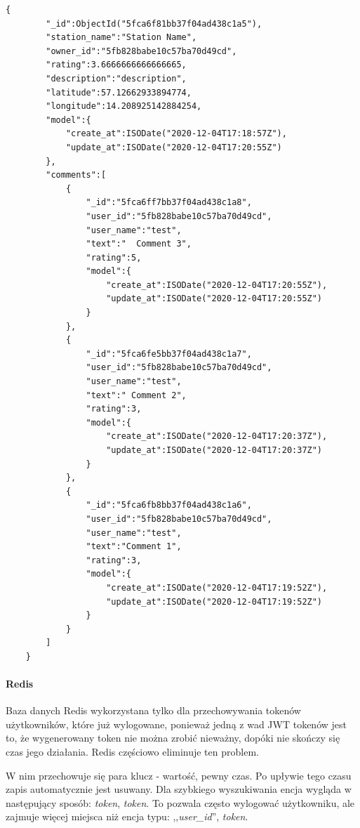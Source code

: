 \begin{lstlisting}[basicstyle=\tiny\ttfamily]
    {
        "_id":ObjectId("5fca6f81bb37f04ad438c1a5"),
        "station_name":"Station Name",
        "owner_id":"5fb828babe10c57ba70d49cd",
        "rating":3.6666666666666665,
        "description":"description",
        "latitude":57.12662933894774,
        "longitude":14.208925142884254,
        "model":{
            "create_at":ISODate("2020-12-04T17:18:57Z"),
            "update_at":ISODate("2020-12-04T17:20:55Z")
        },
        "comments":[
            {
                "_id":"5fca6ff7bb37f04ad438c1a8",
                "user_id":"5fb828babe10c57ba70d49cd",
                "user_name":"test",
                "text":"  Comment 3",
                "rating":5,
                "model":{
                    "create_at":ISODate("2020-12-04T17:20:55Z"),
                    "update_at":ISODate("2020-12-04T17:20:55Z")
                }
            },
            {
                "_id":"5fca6fe5bb37f04ad438c1a7",
                "user_id":"5fb828babe10c57ba70d49cd",
                "user_name":"test",
                "text":" Comment 2",
                "rating":3,
                "model":{
                    "create_at":ISODate("2020-12-04T17:20:37Z"),
                    "update_at":ISODate("2020-12-04T17:20:37Z")
                }
            },
            {
                "_id":"5fca6fb8bb37f04ad438c1a6",
                "user_id":"5fb828babe10c57ba70d49cd",
                "user_name":"test",
                "text":"Comment 1",
                "rating":3,
                "model":{
                    "create_at":ISODate("2020-12-04T17:19:52Z"),
                    "update_at":ISODate("2020-12-04T17:19:52Z")
                }
            }
        ]
    }
\end{lstlisting}

% 
\paragraph{Redis}
\newline
Baza danych Redis wykorzystana tylko dla przechowywania tokenów użytkowników, które już wylogowane, ponieważ jedną z wad JWT tokenów jest to, że wygenerowany token nie można zrobić nieważny, dopóki nie skończy się czas jego działania.
Redis częściowo eliminuje ten problem.

W nim przechowuje się para klucz - wartość, pewny czas. Po upływie tego czasu zapis automatycznie jest usuwany.
Dla szybkiego wyszukiwania encja wygląda w następujący sposób: \textit{token}, \textit{token}. To pozwala często wylogować użytkowniku, ale zajmuje więcej miejsca niż encja typu: ,,\textit{user\_id}'', \textit{token}.

